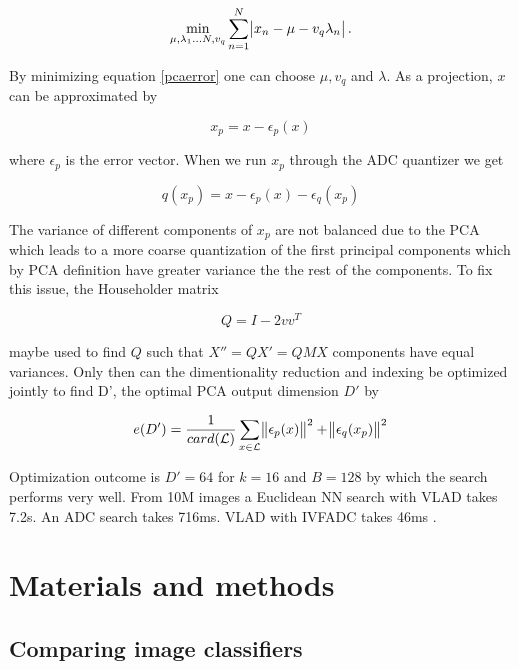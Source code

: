 \documentclass[english,12pt,a4paper,pdftex,elec,utf8]{aaltothesis}
\begin{document}
\begin{equation}\label{pcaerror}
\min_{\mu,\lambda_1\ldots N, v_q}\sum_{n=1}^N \abs{x_n-\mu - v_q\lambda_n}.
\end{equation}

By minimizing equation \ref{pcaerror} one can choose $\mu, v_q$ and $\lambda$. \cite{Blei2008} As a projection, $x$ can be approximated by

\begin{equation}\label{vladpca}
x_p = x -\epsilon_p(x)
\end{equation}

where $\epsilon_p$ is the error vector. \cite{Jegou2014} When we run $x_p$ through the ADC quantizer we get

\begin{equation}\label{vladpcaquant}
  q(x_p) = x - \epsilon_p(x) - \epsilon_q(x_p)
\end{equation}

The variance of different components of $x_p$ are not balanced due to the PCA \cite{Jegou2014} which leads to a more coarse quantization of the first principal components which by PCA definition have greater variance the the rest of the components. To fix this issue, the Householder matrix

\begin{equation}\label{householder}
Q = I - 2vv^T
\end{equation}

maybe used to find $Q$ such that $X'' = QX' = QMX$ components have equal variances.\cite{Jegou2014} Only then can the dimentionality reduction and indexing be optimized jointly to find D', the optimal PCA output dimension $D'$ by

\begin{equation}\label{jointoptimization}
e(D') = \frac{1}{card(\mathcal{L})}\sum_{x\in \mathcal{L}}\norm{\epsilon_p(x)}^2 + \norm{\epsilon_q(x_p)}^2
\end{equation}

Optimization outcome is $D'=64$ for $k=16$ and $B=128$ by which the search performs very well. From 10M images a Euclidean NN search with VLAD takes 7.2s. An ADC search takes 716ms. VLAD with IVFADC takes 46ms \cite{Jegou2014}.
\clearpage

\section{Materials and methods}
\subsection{Comparing image classifiers}
\end{document}
